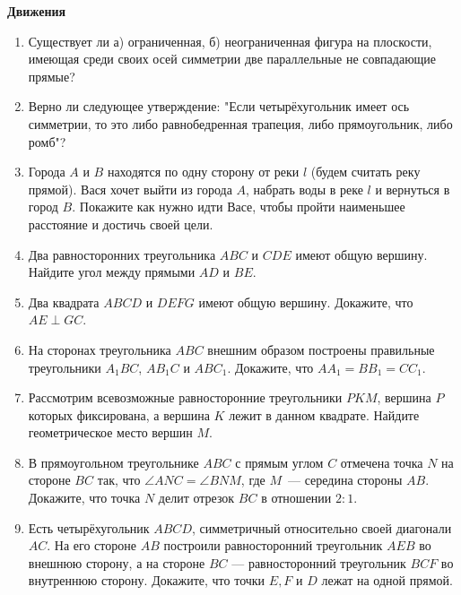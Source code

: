 \documentclass{article}
\begin{document}
\large


\begin{center}
\textbf{Движения}
\end{center}



\begin{enumerate}[label*=\protect\fbox{\arabic{enumi}}]

\item Существует ли а) ограниченная, б) неограниченная фигура на плоскости, имеющая среди своих осей симметрии две параллельные не совпадающие прямые?

\item Верно ли следующее утверждение: "Если четырёхугольник имеет ось симметрии, то это либо равнобедренная трапеция, либо прямоугольник, либо ромб"?

\item Города $A$ и $B$ находятся по одну сторону от реки $l$ (будем считать реку прямой). Вася хочет выйти из города $A$, набрать воды в реке $l$ и вернуться в город $B$. Покажите как нужно идти Васе, чтобы пройти наименьшее расстояние и достичь своей цели.

\item Два равносторонних треугольника $ABC$ и $CDE$ имеют общую вершину. Найдите угол между прямыми $AD$ и $BE$.

\item Два квадрата $ABCD$ и $DEFG$ имеют общую вершину. Докажите, что $AE \perp GC$.

\item На сторонах треугольника $ABC$ внешним образом построены правильные треугольники $A_1BC$, $AB_1C$ и $ABC_1$. Докажите, что $AA_1 = BB_1 = CC_1$. 

\item Рассмотрим всевозможные равносторонние треугольники $PKM$, вершина $P$ которых фиксирована, а вершина $K$ лежит в данном квадрате. Найдите геометрическое место вершин $M$.

\item В прямоугольном треугольнике $ABC$ с прямым углом $C$ отмечена точка $N$ на стороне $BC$
так, что $\angle ANC=\angle BNM$, где $M$~--- середина стороны $AB$. Докажите, что точка $N$ делит отрезок $BC$ в отношении $2:1$.

\item Есть четырёхугольник $ABCD$, симметричный относительно своей диагонали $AC$. На его стороне $AB$ построили равносторонний треугольник $AEB$	во внешнюю сторону, а на стороне $BC$ — равносторонний треугольник $BCF$ во внутреннюю сторону. Докажите, что точки $E, F$ и $D$ лежат на одной прямой.


\end{enumerate}
\end{document}
